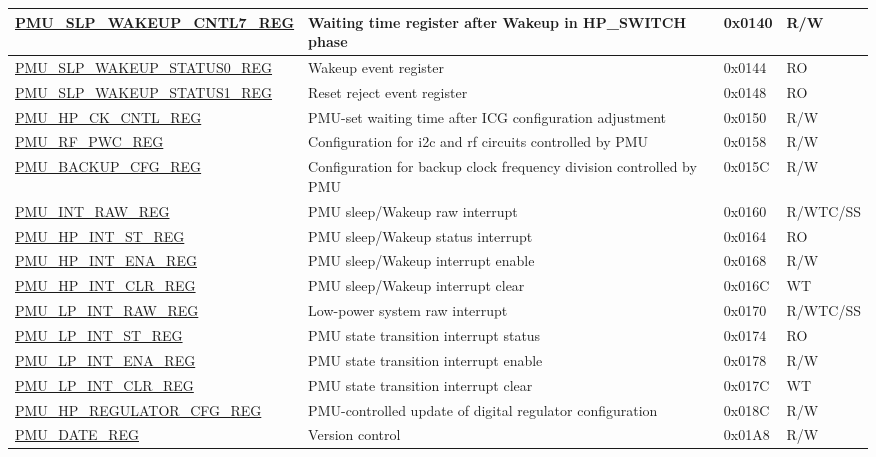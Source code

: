 \begin{longtable}{ | l | p{6cm} | p{1.3cm} | p{1.5cm} | }
\hyperref[regdesc:PMUSLPWAKEUPCNTL7REG]{PMU\_SLP\_WAKEUP\_CNTL7\_REG} & Waiting time register after Wakeup in HP\_SWITCH phase & 0x0140 & R/W \\ \hline
\hyperref[regdesc:PMUSLPWAKEUPSTATUS0REG]{PMU\_SLP\_WAKEUP\_STATUS0\_REG} & Wakeup event register & 0x0144 & RO \\ \hline
\hyperref[regdesc:PMUSLPWAKEUPSTATUS1REG]{PMU\_SLP\_WAKEUP\_STATUS1\_REG} & Reset reject event register & 0x0148 & RO \\ \hline
\hyperref[regdesc:PMUHPCKCNTLREG]{PMU\_HP\_CK\_CNTL\_REG} & PMU-set waiting time after ICG configuration adjustment & 0x0150 & R/W \\ \hline
\hyperref[regdesc:PMURFPWCREG]{PMU\_RF\_PWC\_REG} & Configuration for i2c and rf circuits controlled by PMU & 0x0158 & R/W \\ \hline
\hyperref[regdesc:PMUBACKUPCFGREG]{PMU\_BACKUP\_CFG\_REG} & Configuration for backup clock frequency division controlled by PMU & 0x015C & R/W \\ \hline
\hyperref[regdesc:PMUINTRAWREG]{PMU\_INT\_RAW\_REG} & PMU sleep/Wakeup raw interrupt & 0x0160 & R/WTC/SS \\ \hline
\hyperref[regdesc:PMUHPINTSTREG]{PMU\_HP\_INT\_ST\_REG} & PMU sleep/Wakeup status interrupt & 0x0164 & RO \\ \hline
\hyperref[regdesc:PMUHPINTENAREG]{PMU\_HP\_INT\_ENA\_REG} & PMU sleep/Wakeup interrupt enable & 0x0168 & R/W \\ \hline
\hyperref[regdesc:PMUHPINTCLRREG]{PMU\_HP\_INT\_CLR\_REG} & PMU sleep/Wakeup interrupt clear & 0x016C & WT \\ \hline
\hyperref[regdesc:PMULPINTRAWREG]{PMU\_LP\_INT\_RAW\_REG} & Low-power system raw interrupt & 0x0170 & R/WTC/SS \\ \hline
\hyperref[regdesc:PMULPINTSTREG]{PMU\_LP\_INT\_ST\_REG} & PMU state transition interrupt status & 0x0174 & RO \\ \hline
\hyperref[regdesc:PMULPINTENAREG]{PMU\_LP\_INT\_ENA\_REG} & PMU state transition interrupt enable & 0x0178 & R/W \\ \hline
\hyperref[regdesc:PMULPINTCLRREG]{PMU\_LP\_INT\_CLR\_REG} & PMU state transition interrupt clear & 0x017C & WT \\ \hline
\hyperref[regdesc:PMUHPREGULATORCFGREG]{PMU\_HP\_REGULATOR\_CFG\_REG} & PMU-controlled update of digital regulator configuration & 0x018C & R/W \\ \hline
\hyperref[regdesc:PMUDATEREG]{PMU\_DATE\_REG} & Version control & 0x01A8 & R/W \\ \hline
\end{longtable}